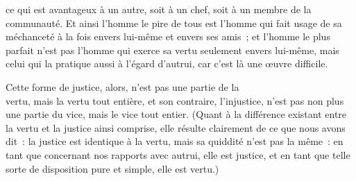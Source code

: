 \documentclass[french,twoside]{book} %
\begin{document}
ce qui est avantageux à un autre, soit à un chef, soit à un membre de la communauté. Et ainsi l’homme le pire de tous est l’homme qui fait usage de sa méchanceté à la fois envers lui-même et envers ses amis ; et l’homme le plus parfait n’est pas l’homme qui exerce sa vertu seulement envers lui-même, mais celui qui la pratique aussi à l’égard d’autrui, car c’est là une œuvre difficile.\par
Cette forme de justice, alors, n’est pas une partie de la \\
vertu, mais la vertu tout entière, et son contraire, l’injustice, n’est pas non plus une partie du vice, mais le vice tout entier. (Quant à la différence existant entre la vertu et la justice ainsi comprise, elle résulte clairement de ce que nous avons dit : la justice est identique à la vertu, mais sa quiddité n’est pas la même : en tant que concernant nos rapports avec autrui, elle est justice, et en tant que telle sorte de disposition pure et simple, elle est vertu.)
\end{document}
